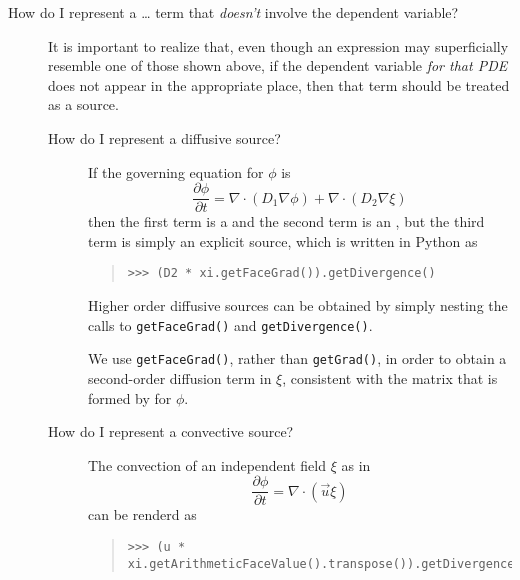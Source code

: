 \begin{description}
\begin{description}
            \item[How do I represent a \dots{} term that 
            \emph{doesn't} involve the dependent variable?]
            It is important to realize that, even though an expression may
            superficially resemble one of those shown above, if the
            dependent variable \emph{for that PDE} does not appear in the
            appropriate place, then that term should be treated as a source.
            \begin{description}
                \item[How do I represent a diffusive source?]
                    If the governing equation for $\phi$ is
                    \[
                        \frac{\partial \phi}{\partial t} 
                        = \nabla\cdot\left( D_1 \nabla \phi\right)
                        + \nabla\cdot\left( D_2 \nabla \xi\right)
                    \]
                    then the first term is a  and the second term 
                    is an , but the third term is 
                    simply an explicit source, which is written in Python as
                    \begin{quote}
\begin{verbatim}
>>> (D2 * xi.getFaceGrad()).getDivergence()
\end{verbatim}
                    \end{quote}
                    Higher order diffusive sources can be obtained by
                    simply nesting the calls to \verb+getFaceGrad()+
                    and \verb+getDivergence()+.
                    \begin{reSTadmonition}[Note]
                        We use \verb|getFaceGrad()|, rather than
                        \verb|getGrad()|, in order to obtain a
                        second-order diffusion term in $\xi$, consistent
                        with the matrix that is formed by
                         for $\phi$.
                    \end{reSTadmonition}

                \item[How do I represent a convective source?]
                    The convection of an independent field $\xi$ as in
                    \[
                        \frac{\partial \phi}{\partial t} 
                        = \nabla\cdot
                        \left(
                            \vec{u} \xi
                        \right)
                    \]
                    can be renderd as
                    \begin{quote}
\begin{verbatim}
>>> (u * xi.getArithmeticFaceValue().transpose()).getDivergence()
\end{verbatim}
                    \end{quote}


\end{description}
\end{description}
\end{description}
